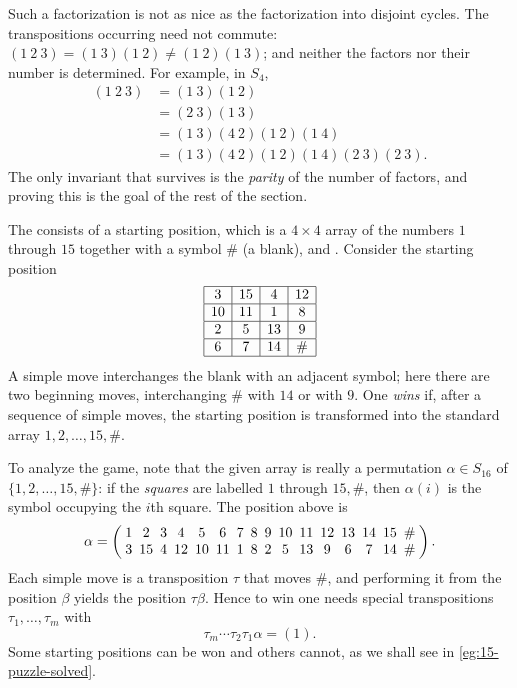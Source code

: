 \begin{remark}
	Such a factorization is not as nice as the factorization into disjoint cycles. The
	transpositions occurring need not commute:
	\((1\ 2\ 3) = (1\ 3)(1\ 2) \neq (1\ 2)(1\ 3)\); and neither the factors nor their
	number is determined. For example, in \(S_4\),
	\begin{align*}
		(1\ 2\ 3) & = (1\ 3)(1\ 2)                              \\
		          & = (2\ 3)(1\ 3)                              \\
		          & = (1\ 3)(4\ 2)(1\ 2)(1\ 4)                  \\
		          & = (1\ 3)(4\ 2)(1\ 2)(1\ 4)(2\ 3)(2\ 3).
	\end{align*}
	The only invariant that survives is the \emph{parity} of the number of factors, and
	proving this is the goal of the rest of the section.
\end{remark}

\begin{eg}\label{eg:15-puzzle}
	The  consists of a starting position, which is a \(4 \times 4\)
	array of the numbers \(1\) through \(15\) together with a symbol \(\#\) (a blank), and
	. Consider the starting position
	\[
		\begin{array}{|c|c|c|c|}
			\hline
			3  & 15 & 4  & 12 \\ \hline
			10 & 11 & 1  & 8  \\ \hline
			2  & 5  & 13 & 9  \\ \hline
			6  & 7  & 14 & \# \\ \hline
		\end{array}
	\]
	A simple move interchanges the blank with an adjacent symbol; here there are two
	beginning moves, interchanging \(\#\) with \(14\) or with \(9\). One \emph{wins} if,
	after a sequence of simple moves, the starting position is transformed into the standard
	array \(1, 2, \dots, 15, \#\).

	To analyze the game, note that the given array is really a permutation
	\(\alpha \in S_{16}\) of \(\{1, 2, \dots, 15, \#\}\): if the \emph{squares} are labelled
	\(1\) through \(15, \#\), then \(\alpha(i)\) is the symbol occupying the \(i\)th square.
	The position above is
	\[
		\alpha =
		\setlength{\arraycolsep}{2.5pt}
		\left(\begin{array}{*{16}{c}}
				1 & 2  & 3 & 4  & 5  & 6  & 7 & 8 & 9 & 10 & 11 & 12 & 13 & 14 & 15 & \# \\
				3 & 15 & 4 & 12 & 10 & 11 & 1 & 8 & 2 & 5  & 13 & 9  & 6  & 7  & 14 & \#
			\end{array}\right).
	\]
	Each simple move is a transposition \(\tau\) that moves \(\#\), and performing it from
	the position \(\beta\) yields the position \(\tau\beta\). Hence to win one needs special
	transpositions \(\tau_1, \dots, \tau_m\) with
	\[
		\tau_m \cdots \tau_2\tau_1\alpha = (1).
	\]
	Some starting positions can be won and others cannot, as we shall see in
	\autoref{eg:15-puzzle-solved}.
\end{eg}

